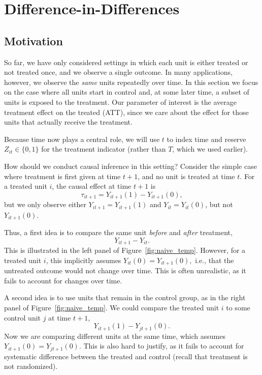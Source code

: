 \documentclass[11pt]{exam}
\begin{document}

\begingroup\small

\section{Difference-in-Differences}
\subsection{Motivation}
So far, we have only considered settings in which each unit is either treated or not treated once, and we observe a single outcome. In many applications, however, we observe the \emph{same} units repeatedly over time. In this section we focus on the case where all units start in control and, at some later time, a subset of units is exposed to the treatment. Our parameter of interest is the average treatment effect on the treated (ATT), since we care about the effect for those units that actually receive the treatment.

Because time now plays a central role, we will use $t$ to index time and reserve $Z_{it} \in \{0,1\}$ for the treatment indicator (rather than $T$, which we used earlier).

How should we conduct causal inference in this setting? Consider the simple case where treatment is first given at time $t+1$, and no unit is treated at time $t$. For a treated unit $i$, the causal effect at time $t+1$ is
\[
  \tau_{i t+1}= Y_{it+1}(1) - Y_{it+1}(0),
\]
but we only observe either $Y_{it+1} = Y_{it+1}(1)$ and $Y_{it} = Y_{it}(0)$, but not $Y_{it+1}(0)$. 

Thus, a first idea is to compare the same unit \emph{before} and \emph{after} treatment,
\[
  Y_{it+1} - Y_{it}.
\]
This is illustrated in the left panel of Figure~\ref{fig:naive_temp}. However, for a treated unit $i$, this implicitly assumes $Y_{it}(0) = Y_{it+1}(0),$
i.e., that the untreated outcome would not change over time. This is often unrealistic, as it fails to account for changes over time.

A second idea is to use units that remain in the control group, as in the right panel of Figure~\ref{fig:naive_temp}. We could compare the treated unit $i$ to some control unit $j$ at time $t+1$,
\[
  Y_{it+1}(1) - Y_{jt+1}(0).
\]
Now we are comparing different units at the same time, which assumes $ Y_{it+1}(0) = Y_{jt+1}(0)$. This is also hard to justify, as it fails to account for systematic difference between the treated and control (recall that treatment is not randomized).
\end{document}
